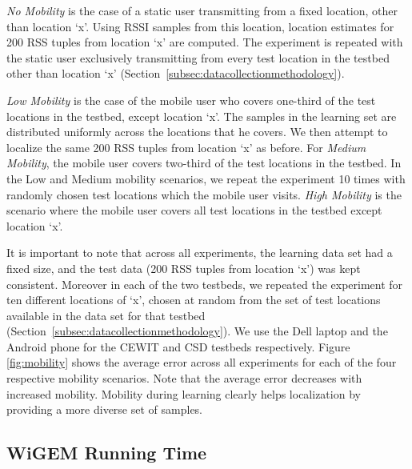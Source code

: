 {\it No Mobility } is the case of a static user transmitting from a fixed location, other than location `x'. Using RSSI samples from this location,  location estimates for 200 RSS tuples from location `x' are computed. The experiment is repeated with the static user exclusively transmitting from every test location in the testbed other than location `x' (Section~\ref{subsec:datacollectionmethodology}). 

{\it Low Mobility } is the case of the mobile user who covers one-third of the test locations in the testbed, except location `x'. The samples in the learning set are distributed uniformly across the locations that he covers. We then attempt to localize the same 200 RSS tuples from location `x' as before.  For {\it Medium Mobility}, the mobile user covers two-third of the test locations in the testbed. In the Low and Medium mobility scenarios, we repeat the experiment 10 times with randomly chosen test locations which the mobile user visits. {\it High Mobility } is the scenario where the mobile user covers all test locations in the testbed except location `x'. 

It is important to note that across all experiments, the learning data set had a fixed size, and the test data (200 RSS tuples from location `x') was kept consistent. Moreover in each of the two testbeds, we repeated the experiment for ten different locations of `x', chosen at random from the set of test locations available in the data set for that testbed (Section~\ref{subsec:datacollectionmethodology}). We use the Dell laptop and the Android phone for the CEWIT and CSD testbeds respectively. Figure \ref{fig:mobility} shows the average error across all experiments for each of the four respective mobility scenarios. Note that the average error decreases with increased mobility. Mobility during learning clearly helps localization by providing a more diverse set of samples. 

\subsection{WiGEM Running Time}
\label{subsec:runningtime}


